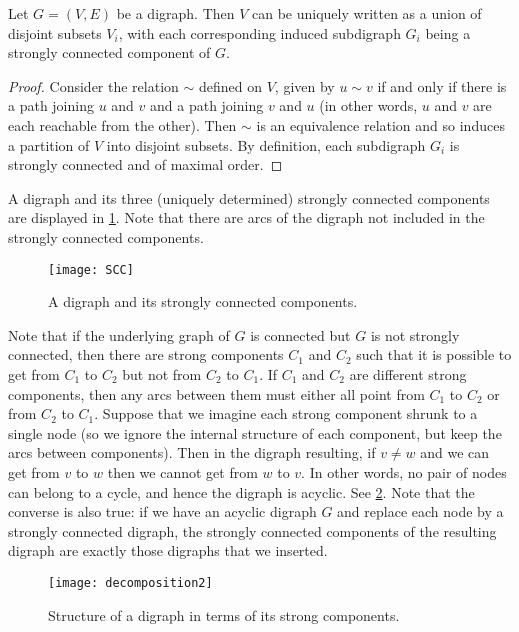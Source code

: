 \begin{Theorem}
\label{thm:scc}
Let $G=(V, E)$ be a digraph. Then $V$ can be uniquely written as a union of
disjoint subsets $V_i$, with each corresponding induced subdigraph $G_i$ being
a strongly connected component of $G$.
\end{Theorem}

\begin{proof} Consider the relation $\sim$ defined on $V$, given by
$u\sim v$ if and only if there is a path joining $u$ and $v$ and a path
joining $v$ and $u$ (in other words, $u$ and $v$ are each reachable
from the other). Then $\sim$ is an equivalence relation and so induces
a partition of $V$ into disjoint subsets.  By definition, each 
subdigraph $G_i$ is strongly connected and of maximal order.
\end{proof}

\begin{Example}\label{eg:scc}
A digraph and its three (uniquely determined) strongly connected
components are displayed in \cref{fig:scc}. Note that there are
arcs of the digraph not included in the strongly connected components.
\end{Example}

\begin{figure}[htbp]
\centering
\texttt{[image: SCC]}
\caption{A digraph and its strongly connected components.}
\label{fig:scc}
\end{figure}

Note that if the underlying graph of $G$ is connected but $G$ is
not strongly connected, then  there are strong components $C_1$ and
$C_2$ such that it is possible to get from $C_1$ to $C_2$ but not
from $C_2$ to $C_1$. If $C_1$ and $C_2$ are different strong
components, then any arcs between them must either all point from
$C_1$ to $C_2$ or from $C_2$ to $C_1$.  Suppose that we imagine
each strong component shrunk to a single node (so we ignore the
internal structure of each component, but keep the arcs between
components). Then in the digraph resulting, if $v\neq w$ and we can
get from $v$ to $w$ then we cannot get from $w$ to $v$. In other
words, no pair of nodes can belong to a cycle, and hence the digraph
is acyclic. See \cref{fig:sccdecomp}. Note that the converse
is also true: if we have an acyclic digraph $G$ and replace each
node by a strongly connected digraph, the strongly connected
components of the resulting digraph are exactly those digraphs that
we inserted.

\begin{figure}[htbp]
\centering
\texttt{[image: decomposition2]}
\caption{Structure of a digraph in terms of its strong components.}
\label{fig:sccdecomp}
\end{figure}

